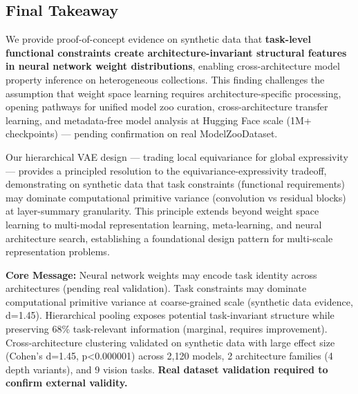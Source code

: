 \subsection{Final Takeaway}

We provide proof-of-concept evidence on synthetic data that \textbf{task-level functional constraints create architecture-invariant structural features in neural network weight distributions}, enabling cross-architecture model property inference on heterogeneous collections. This finding challenges the assumption that weight space learning requires architecture-specific processing, opening pathways for unified model zoo curation, cross-architecture transfer learning, and metadata-free model analysis at Hugging Face scale (1M+ checkpoints) --- pending confirmation on real ModelZooDataset.

Our hierarchical VAE design --- trading local equivariance for global expressivity --- provides a principled resolution to the equivariance-expressivity tradeoff, demonstrating on synthetic data that task constraints (functional requirements) may dominate computational primitive variance (convolution vs residual blocks) at layer-summary granularity. This principle extends beyond weight space learning to multi-modal representation learning, meta-learning, and neural architecture search, establishing a foundational design pattern for multi-scale representation problems.

\textbf{Core Message:} Neural network weights may encode task identity across architectures (pending real validation). Task constraints may dominate computational primitive variance at coarse-grained scale (synthetic data evidence, d=1.45). Hierarchical pooling exposes potential task-invariant structure while preserving 68\% task-relevant information (marginal, requires improvement). Cross-architecture clustering validated on synthetic data with large effect size (Cohen's d=1.45, p<0.000001) across 2,120 models, 2 architecture families (4 depth variants), and 9 vision tasks. \textbf{Real dataset validation required to confirm external validity.}
